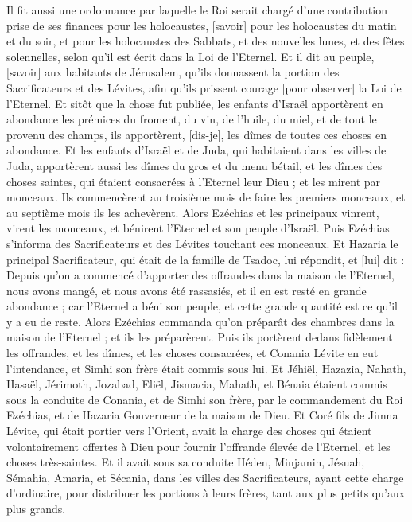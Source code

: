 \begin{multicols}{2}
Il fit aussi une ordonnance par laquelle le Roi serait chargé d'une contribution prise de ses finances pour les holocaustes, [savoir] pour les holocaustes du matin et du soir, et pour les holocaustes des Sabbats, et des nouvelles lunes, et des fêtes solennelles, selon qu'il est écrit dans la Loi de l'Eternel.
Et il dit au peuple, [savoir] aux habitants de Jérusalem, qu'ils donnassent la portion des Sacrificateurs et des Lévites, afin qu'ils prissent courage [pour observer] la Loi de l'Eternel.
Et sitôt que la chose fut publiée, les enfants d'Israël apportèrent en abondance les prémices du froment, du vin, de l'huile, du miel, et de tout le provenu des champs, ils apportèrent, [dis-je], les dîmes de toutes ces choses en abondance.
Et les enfants d'Israël et de Juda, qui habitaient dans les villes de Juda, apportèrent aussi les dîmes du gros et du menu bétail, et les dîmes des choses saintes, qui étaient consacrées à l'Eternel leur Dieu ; et les mirent par monceaux.
Ils commencèrent au troisième mois de faire les premiers monceaux, et au septième mois ils les achevèrent.
Alors Ezéchias et les principaux vinrent, virent les monceaux, et bénirent l'Eternel et son peuple d'Israël.
Puis Ezéchias s'informa des Sacrificateurs et des Lévites touchant ces monceaux.
Et Hazaria le principal Sacrificateur, qui était de la famille de Tsadoc, lui répondit, et [lui] dit : Depuis qu'on a commencé d'apporter des offrandes dans la maison de l'Eternel, nous avons mangé, et nous avons été rassasiés, et il en est resté en grande abondance ; car l'Eternel a béni son peuple, et cette grande quantité est ce qu'il y a eu de reste.
Alors Ezéchias commanda qu'on préparât des chambres dans la maison de l'Eternel ; et ils les préparèrent.
Puis ils portèrent dedans fidèlement les offrandes, et les dîmes, et les choses consacrées, et Conania Lévite en eut l'intendance, et Simhi son frère était commis sous lui.
Et Jéhiël, Hazazia, Nahath, Hasaël, Jérimoth, Jozabad, Eliël, Jismacia, Mahath, et Bénaia étaient commis sous la conduite de Conania, et de Simhi son frère, par le commandement du Roi Ezéchias, et de Hazaria Gouverneur de la maison de Dieu.
Et Coré fils de Jimna Lévite, qui était portier vers l'Orient, avait la charge des choses qui étaient volontairement offertes à Dieu pour fournir l'offrande élevée de l'Eternel, et les choses très-saintes.
Et il avait sous sa conduite Héden, Minjamin, Jésuah, Sémahia, Amaria, et Sécania, dans les villes des Sacrificateurs, ayant cette charge d'ordinaire, pour distribuer les portions à leurs frères, tant aux plus petits qu'aux plus grands.

\end{multicols}
